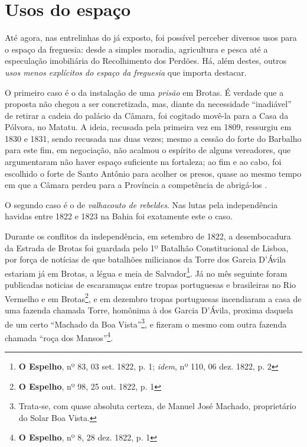 \section{Usos do espaço}\label{sec:2.4}

Até agora, nas entrelinhas do já exposto, foi possível perceber diversos usos para o espaço da freguesia: desde a simples moradia, agricultura e pesca até a especulação imobiliária do Recolhimento dos Perdões. Há, além destes, outros \textit{usos menos explícitos do espaço da freguesia} que importa destacar.

O primeiro caso é o da instalação de uma \textit{prisão} em Brotas. É verdade que a proposta não chegou a ser concretizada, mas, diante da necessidade ``inadiável'' de retirar a cadeia do palácio da Câmara, foi cogitado movê-la para a Casa da Pólvora, no Matatu. A ideia, recusada pela primeira vez em 1809, ressurgiu em 1830 e 1831, sendo recusada nas duas vezes; mesmo a cessão do forte do Barbalho para este fim, em negociação, não acalmou o espírito de alguns vereadores, que argumentaram não haver espaço suficiente na fortaleza; ao fim e ao cabo, foi escolhido o forte de Santo Antônio para acolher os presos, quase ao mesmo tempo em que a Câmara perdeu para a Província a competência de abrigá-los \cite[pp.~304-305]{ruy_camara_1953}.

O segundo caso é o de \textit{valhacouto de rebeldes}. Nas lutas pela independência havidas entre 1822 e 1823 na Bahia foi exatamente este o caso. 

Durante os conflitos da independência, em setembro de 1822, a desembocadura da Estrada de Brotas foi guardada pelo 1º Batalhão Constitucional de Lisboa, por força de notícias de que batalhões milicianos da Torre dos Garcia D'Ávila estariam já em Brotas, a légua e meia de Salvador\footnote{\textbf{O Espelho}, nº 83, 03 set. 1822, p. 1; \textit{idem}, nº 110, 06 dez. 1822, p. 2}. Já no mês seguinte foram publicadas noticias de escaramuças entre tropas portuguesas e brasileiras no Rio Vermelho e em Brotas\footnote{\textbf{O Espelho}, nº 98, 25 out. 1822, p. 1}, e em dezembro tropas portuguesas incendiaram a casa de uma fazenda chamada Torre, homônima à dos Garcia D'Ávila, proxima daquela de um certo ``Machado da Boa Vista''\footnote{Trata-se, com quase absoluta certeza, de Manuel José Machado, proprietário do Solar Boa Vista.}, e fizeram o mesmo com outra fazenda chamada ``roça dos Mansos''\footnote{\textbf{O Espelho}, nº 8, 28 dez. 1822, p. 1}.

